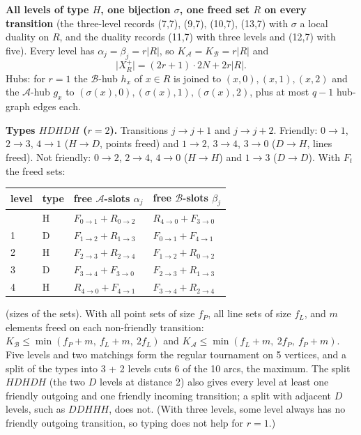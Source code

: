 \documentclass[
  11pt,
]{article}
\begin{document}
\textbf{All levels of type \(H\), one bijection \(\sigma\), one freed set \(R\) on every transition} (the three-level
records (7,7), (9,7), (10,7), (13,7) with \(\sigma\) a local duality on \(R\), and the duality records (11,7) with three
levels and (12,7) with five). Every level has \(\alpha_j = \beta_j = r\lvert R\rvert\), so
\(K_{\mathcal A} = K_{\mathcal B} = r\lvert R\rvert\) and \[\lvert X_R^+\rvert = (2r+1)\cdot 2N + 2r\lvert R\rvert .\]
Hubs: for \(r = 1\) the \(\mathcal B\)-hub \(h_x\) of \(x\in R\) is joined to \((x,0),(x,1),(x,2)\) and the
\(\mathcal A\)-hub \(g_x\) to \((\sigma(x),0),(\sigma(x),1),(\sigma(x),2)\), plus at most \(q-1\) hub-graph edges each.

\textbf{Types \(HDHDH\) (\(r = 2\)).} Transitions \(j\to j+1\) and \(j\to j+2\). Friendly: \(0\to1\), \(2\to3\),
\(4\to1\) (\(H\to D\), points freed) and \(1\to2\), \(3\to4\), \(3\to0\) (\(D\to H\), lines freed). Not friendly:
\(0\to2\), \(2\to4\), \(4\to0\) (\(H\to H\)) and \(1\to3\) (\(D\to D\)). With \(F_t\) the freed sets:

\begin{longtable}[]{@{}llll@{}}
\toprule\noalign{}
level & type & free \(\mathcal A\)-slots \(\alpha_j\) & free \(\mathcal B\)-slots \(\beta_j\) \\
\midrule\noalign{}
\endhead
\bottomrule\noalign{}
\endlastfoot
0 & H & \(F_{0\to1} + R_{0\to2}\) & \(R_{4\to0} + F_{3\to0}\) \\
1 & D & \(F_{1\to2} + R_{1\to3}\) & \(F_{0\to1} + F_{4\to1}\) \\
2 & H & \(F_{2\to3} + R_{2\to4}\) & \(F_{1\to2} + R_{0\to2}\) \\
3 & D & \(F_{3\to4} + F_{3\to0}\) & \(F_{2\to3} + R_{1\to3}\) \\
4 & H & \(R_{4\to0} + F_{4\to1}\) & \(F_{3\to4} + R_{2\to4}\) \\
\end{longtable}

(sizes of the sets). With all point sets of size \(f_P\), all line sets of size \(f_L\), and \(m\) elements freed on
each non-friendly transition: \(K_{\mathcal B}\le\min(f_P+m,\ f_L+m,\ 2f_L)\) and
\(K_{\mathcal A}\le\min(f_L+m,\ 2f_P,\ f_P+m)\). Five levels and two matchings form the regular tournament on 5
vertices, and a split of the types into 3 + 2 levels cuts 6 of the 10 arcs, the maximum. The split \(HDHDH\) (the two
\(D\) levels at distance 2) also gives every level at least one friendly outgoing and one friendly incoming transition;
a split with adjacent \(D\) levels, such as \(DDHHH\), does not. (With three levels, some level always has no friendly
outgoing transition, so typing does not help for \(r = 1\).)
\end{document}
